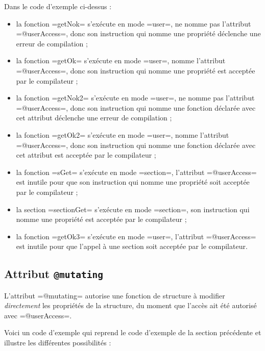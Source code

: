 Dans le code d'exemple ci-dessus :
\begin{itemize}
  \item la fonction \plm=getNok= s'exécute en mode \plm=user=, ne nomme pas l'attribut \plm=@userAccess=, donc son instruction qui nomme une propriété déclenche une erreur de compilation ;
  \item la fonction \plm=getOk= s'exécute en mode \plm=user=, nomme l'attribut \plm=@userAccess=, donc son instruction qui nomme une propriété est acceptée par le compilateur ;
  \item la fonction \plm=getNok2= s'exécute en mode \plm=user=, ne nomme pas l'attribut \plm=@userAccess=, donc son instruction qui nomme une fonction déclarée avec cet attribut déclenche une erreur de compilation ;
  \item la fonction \plm=getOk2= s'exécute en mode \plm=user=, nomme l'attribut \plm=@userAccess=, donc son instruction qui nomme une fonction déclarée avec cet attribut est acceptée par le compilateur ;
  \item la fonction \plm=sGet= s'exécute en mode \plm=section=, l'attribut \plm=@userAccess= est inutile pour que son instruction qui nomme une propriété soit acceptée par le compilateur ;
  \item la section \plm=sectionGet= s'exécute en mode \plm=section=, son instruction qui nomme une propriété est acceptée par le compilateur ;
  \item la fonction \plm=getOk3= s'exécute en mode \plm=user=, l'attribut \plm=@userAccess= est inutile pour que l'appel à une section soit acceptée par le compilateur.
\end{itemize}



\subsection{Attribut \texttt{@mutating}}

L'attribut \plm=@mutating= autorise une fonction de structure à modifier \emph{directement} les propriétés de la structure, du moment que l'accès ait été autorisé avec \plm=@userAccess=.

Voici un code d'exemple qui reprend le code d'exemple de la section précédente et illustre les différentes possibilités :

